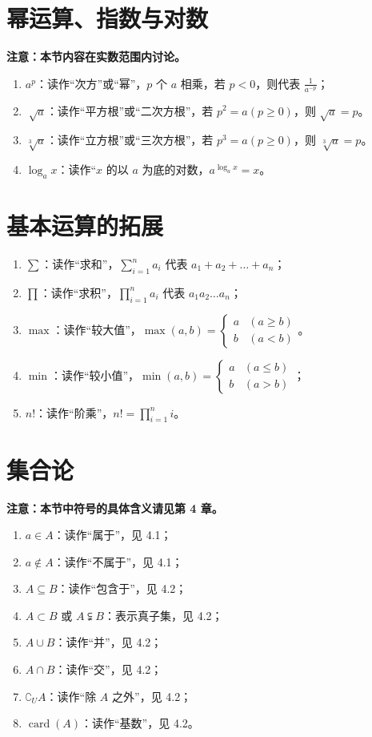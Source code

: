 \section{幂运算、指数与对数}

\textbf{注意：本节内容在实数范围内讨论。}

\begin{enumerate}
\item $a^p$：读作“次方”或“幂”，$p$ 个 $a$ 相乘，若 $p < 0$，则代表 $\frac{1}{a^{-p}}$；
\item $\sqrt[]{a}$：读作“平方根”或“二次方根”，若 $p^2=a(p \geq 0)$，则 $\sqrt{a} = p$。
\item $\sqrt[3]{a}$：读作“立方根”或“三次方根”，若 $p^3=a(p \geq 0)$，则 $\sqrt[3]{a} = p$。
\item $\log_a x$：读作“$x$ 的以 $a$ 为底的对数，$a^{\log_a x} = x$。
\end{enumerate}

\section{基本运算的拓展}

\begin{enumerate}
\item $\sum$：读作“求和”，$\sum\limits_{i=1}^n a_i$ 代表 $a_1 + a_2 + \dots + a_n$；
\item $\prod$：读作“求积”，$\prod\limits_{i=1}^n a_i$ 代表 $a_1  a_2 \dots a_n$；
\item $\max$：读作“较大值”，$\max(a, b) = \begin{cases}
a &(a \geq b)\\
b &(a < b)
\end{cases}$。
\item $\min$：读作“较小值”，$\min(a, b) = \begin{cases}
a &(a \leq b)\\
b &(a > b)
\end{cases}$；
\item $n!$：读作“阶乘”，$n! = \prod\limits_{i=1}^n i$。
\end{enumerate}

\section{集合论}

\textbf{注意：本节中符号的具体含义请见第 4 章。}

\begin{enumerate}
\item $a \in A$：读作“属于”，见 4.1；
\item $a \notin A$：读作“不属于”，见 4.1；
\item $A \subseteq B$：读作“包含于”，见 4.2；
\item $A \subset B$ 或 $A \subsetneqq B$：表示真子集，见 4.2；
\item $A \cup B$：读作“并”，见 4.2；
\item $A \cap B$：读作“交”，见 4.2；
\item $\complement_U A$：读作“除 $A$ 之外”，见 4.2；
\item $\operatorname{card}(A)$：读作“基数”，见 4.2。
\end{enumerate}

